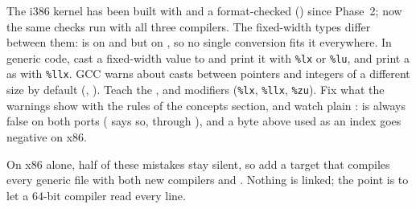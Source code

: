 \documentclass[11pt,a4paper]{article}
\begin{document}
The i386 kernel has been built with  and a format-checked 
() since Phase~2; now the same checks run with all three compilers. The
fixed-width types differ between them:  is  on  and
 but  on , so no single conversion fits it everywhere. In
generic code, cast a fixed-width value to  and print it with \texttt{\%lx} or \texttt{\%lu}, and
print a  as  with \texttt{\%llx}. GCC warns about casts between pointers
and integers of a different size by default (, ). Teach
 the ,  and  modifiers (\texttt{\%lx}, \texttt{\%llx}, \texttt{\%zu}). Fix what
the warnings show with the rules of the concepts section, and watch plain :  is always
false on both ports ( says so, through ), and a byte above  used as an
index goes negative on x86.

On x86 alone, half of these mistakes stay silent, so add a target that compiles every generic file with both new
compilers and . Nothing is linked; the point is to let a 64-bit compiler read every line.

\end{document}
